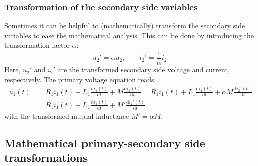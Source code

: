 \begin{frame}
	\frametitle{Transformation of the secondary side variables}
		Sometimes it can be helpful to (mathematically) transform the secondary side variables to ease the mathematical analysis. This can be done by introducing the transformation factor $\alpha$:
		\begin{equation}
			u_2' = \alpha u_2, \qquad i_2' = \frac{1}{\alpha} i_2.
		\end{equation}
		\pause
		Here, $u_2'$ and $i_2'$ are the transformed secondary side voltage and current, respectively. \pause The primary voltage equation reads
		\begin{equation}
			\begin{split}
			u_1(t) &= R_1 i_1(t) + L_1 \frac{\mathrm{d}i_1(t)}{\mathrm{d}t} + M \frac{\mathrm{d}i_2(t)}{\mathrm{d}t}  = R_1 i_1 (t)+ L_1 \frac{\mathrm{d}i_1(t)}{\mathrm{d}t}  + \alpha M \frac{\mathrm{d}i_2'(t)}{\mathrm{d}t}  \\&= R_1 i_1(t) + L_1 \frac{\mathrm{d}i_1(t)}{\mathrm{d}t} + M' \frac{\mathrm{d}i_2'(t)}{\mathrm{d}t}
		\end{split}
		\end{equation}
		with the transformed mutual inductance $M' = \alpha M$. 
\end{frame}

\subsection{Mathematical primary-secondary side transformations}


